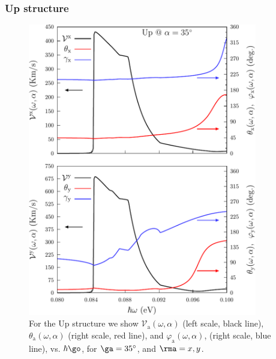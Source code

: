 \documentclass[floatfix,prb,aps,superscriptaddress,showpacs,11pt,preprint,letterpaper]{revtex4}
\def\tama{10cm}
\begin{document}
\subsubsection{Up structure}

\begin{figure}[t]
\centering
\includegraphics[width=\tama]{upplots/up-vx-vy-w1}
\caption{For the Up structure we show
$\mathcal{V}_{\mathrm{a}} (\omega,\alpha)$
(left scale, black line),  
$\theta_{\mathrm{a}} (\omega,\alpha)$
(right scale, red line), and
$\varphi_{\mathrm{a}} (\omega,\alpha)$,
(right scale, blue line),
vs. $\hbar\go$, for $\ga=35^\circ$, 
and $\rma=x,y$.
}
\label{fig:up-vab-comp-rtp-1}
\end{figure}
\end{document}
